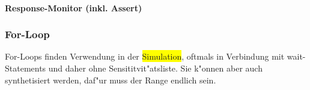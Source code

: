 %				
%					
%					
%					
\vspace{-\baselineskip}
\begin{minipage}{0.63\textwidth}
	\paragraph{Response-Monitor (inkl. Assert)}
		
\end{minipage}
\hfill
\begin{minipage}{0.35\textwidth}
	\subsubsection{For-Loop} %
	For-Loops finden Verwendung in der \colorbox{yellow}{Simulation}, oftmals in Verbindung mit wait-Statements und daher ohne Sensititvit"atsliste. Sie k"onnen aber auch synthetisiert werden, daf"ur muss der Range 
	endlich sein.
	
\end{minipage}
					
